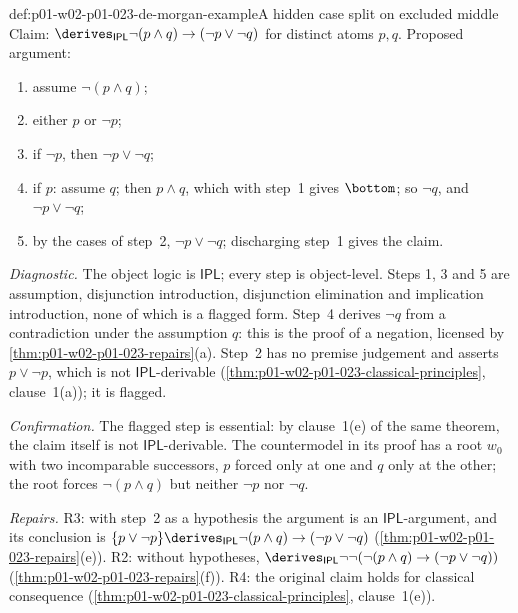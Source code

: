 \begin{hbexample}{def:p01-w02-p01-023-de-morgan-example}{A hidden case split on excluded middle}
Claim: \(\derives_{\mathsf{IPL}}\neg(p\land q)\to(\neg p\lor\neg q)\) for
distinct atoms \(p,q\). Proposed argument:
\begin{enumerate}
  \item assume \(\neg(p\land q)\);
  \item either \(p\) or \(\neg p\);
  \item if \(\neg p\), then \(\neg p\lor\neg q\);
  \item if \(p\): assume \(q\); then \(p\land q\), which with step~1 gives
        \(\bottom\); so \(\neg q\), and \(\neg p\lor\neg q\);
  \item by the cases of step~2, \(\neg p\lor\neg q\); discharging step~1
        gives the claim.
\end{enumerate}
\emph{Diagnostic.} The object logic is \(\mathsf{IPL}\); every step is
object-level. Steps 1, 3 and 5 are assumption, disjunction introduction,
disjunction elimination and implication introduction, none of which is a
flagged form. Step~4 derives
\(\neg q\) from a contradiction under the assumption \(q\): this is the proof
of a negation, licensed by \cref{thm:p01-w02-p01-023-repairs}(a). Step~2
has no premise judgement and asserts \(p\lor\neg p\), which is not
\(\mathsf{IPL}\)-derivable
(\cref{thm:p01-w02-p01-023-classical-principles}, clause~1(a)); it is
flagged.

\emph{Confirmation.} The flagged step is essential: by clause~1(e) of the
same theorem, the claim itself is not \(\mathsf{IPL}\)-derivable. The
countermodel in its proof has a root \(w_0\) with two incomparable
successors, \(p\) forced only at one and \(q\) only at the other; the root
forces \(\neg(p\land q)\) but neither \(\neg p\) nor \(\neg q\).

\emph{Repairs.} R3: with step~2 as a hypothesis the argument is an
\(\mathsf{IPL}\)-argument, and its conclusion is
\(\{p\lor\neg p\}\derives_{\mathsf{IPL}}\neg(p\land q)\to(\neg p\lor\neg q)\)
(\cref{thm:p01-w02-p01-023-repairs}(e)). R2: without hypotheses,
\(\derives_{\mathsf{IPL}}\neg\neg(\neg(p\land q)\to(\neg p\lor\neg q))\)
(\cref{thm:p01-w02-p01-023-repairs}(f)). R4: the original claim holds for
classical consequence (\cref{thm:p01-w02-p01-023-classical-principles},
clause~1(e)).
\end{hbexample}

